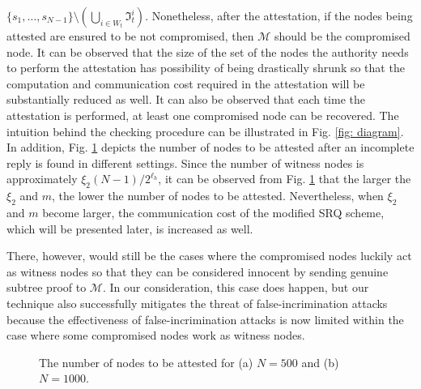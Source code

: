 \documentclass[conference]{IEEEtran}
\begin{document}
$\{s_1,\dots,s_{N-1}\}\setminus(\bigcup_{i\in W_t}\mathfrak{I}_t^i)$. Nonetheless, after the attestation, if the nodes being attested are ensured to be not compromised, then $\mathcal{M}$ should be the compromised node. It can be observed that the size of the set of the nodes the authority needs to perform the attestation has possibility of being drastically shrunk so that the computation and communication cost required in the attestation will be substantially reduced as well. It can also be observed that each time the attestation is performed, at least one compromised node can be recovered. The intuition behind the checking procedure can be illustrated in Fig. \ref{fig: diagram}. In addition, Fig. \ref{fig: number of nodes to be attested} depicts the number of nodes to be attested after an incomplete reply is found in different settings. Since the number of witness nodes is approximately $\xi_2(N-1)/2^{\ell_h}$, it can be observed from Fig. \ref{fig: number of nodes to be attested} that the larger the $\xi_2$ and $m$, the lower the number of nodes to be attested. Nevertheless, when $\xi_2$ and $m$ become larger, the communication cost of the modified SRQ scheme, which will be presented later, is increased as well.

There, however, would still be the cases where the compromised nodes luckily act as witness nodes so that they can be considered innocent by sending genuine subtree proof to $\mathcal{M}$. In our consideration, this case does happen, but our technique also successfully mitigates the threat of false-incrimination attacks because the effectiveness of false-incrimination attacks is now limited within the case where some compromised nodes work as witness nodes.

\begin{figure}[h]
\centering
{}
\caption{\scriptsize The number of nodes to be attested for (a) $N=500$ and (b) $N=1000$.} \label{fig: number of nodes to be attested}
\end{figure}
\end{document}
